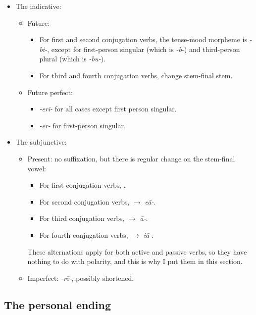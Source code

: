 \documentclass[a4paper, oneside]{report}
\newcommand{\form}[1]{\emph{#1}}
\begin{document}
\begin{itemize}
    \item The indicative:
    \begin{itemize}
        \item Future: 
        \begin{itemize}
            \item For first and second conjugation verbs, 
            the tense-mood morpheme is \form{-bi-}, except for 
            first-person singular (which is \form{-b-})
            and third-person plural (which is \form{-bu-}).
            \item For third and fourth conjugation verbs, change stem-final stem.
        \end{itemize}
        \item Future perfect: 
        \begin{itemize}
            \item \form{-eri-} for all cases except first person singular.
            \item \form{-er-} for first-person singular.
        \end{itemize}
    \end{itemize}
    \item The subjunctive:
    \begin{itemize}
        \item Present: no suffixation, but there is regular change on the stem-final vowel:
        \begin{itemize}
            \item For first conjugation verbs, .
            \item For second conjugation verbs, \form{} $\to$ \form{e\={a}-}.
            \item For third conjugation verbs, $\to$ \form{\={a}-}.
            \item For fourth conjugation verbs, $\to$ \form{i\={a}-}.
        \end{itemize}
        These alternations apply for both active and passive verbs,
        so they have nothing to do with polarity, and this is why I put them in this section.
        \item Imperfect: \form{-r\={e}-}, possibly shortened.
    \end{itemize}
\end{itemize}

\subsection{The personal ending}
\end{document}
